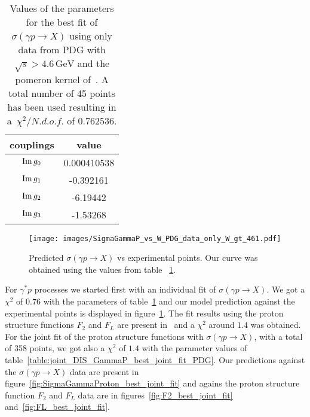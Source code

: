 \documentclass[preprint, 12pt]{elsarticle}
\begin{document}
\begin{table}[b!]
\centering
\caption{Values of the parameters for the best fit of $\sigma\left(\gamma p \rightarrow X\right)$ using only data from PDG with $\sqrt{s} > 4.6 \, \text{GeV}$ and the pomeron kernel of~\cite{gluonPDF_IHQCD_2020}. A total number of 45 points has been used resulting in a~$\chi^2 / {N.d.o.f.}$ of 0.762536. }
\vspace{0.5cm}
\begin{tabular}{|c|c|}
\hline
couplings   & value \\
\hline
${\rm Im} \, g_0$  & 0.000410538\\ 
\hline
${\rm Im} \, g_1$  & -0.392161 \\ 
\hline
${\rm Im} \, g_2$  & -6.19442  \\
\hline
${\rm Im} \, g_3$  & -1.53268\\ 
\hline
\end{tabular}
\label{table:SigmaGammaP_HardPomeron_PDG_best_fit}
\end{table}
\begin{figure}[!b]
\center
\texttt{[image: images/SigmaGammaP\_vs\_W\_PDG\_data\_only\_W\_gt\_461.pdf]} 
\caption{Predicted $\sigma \left( \gamma p \rightarrow X \right)$ vs experimental points. Our curve was obtained using the values from table ~\ref{table:SigmaGammaP_HardPomeron_PDG_best_fit}.}
\label{fig:SigmaGammaProton_data_only_best_fit}
\end{figure}
For $\gamma^{*}p$ processes we started first with an individual fit of $\sigma\left(\gamma p \rightarrow X\right)$. We got a $\chi^2$ of $0.76$ with the parameters of table~\ref{table:SigmaGammaP_HardPomeron_PDG_best_fit} and our model prediction against the experimental points is displayed in figure~\ref{fig:SigmaGammaProton_data_only_best_fit}. The fit results using the proton structure functions $F_2$ and $F_L$ are present in~\cite{gluonPDF_IHQCD_2020} and a $\chi^2$ around $1.4$ was obtained. For the joint fit of the proton structure functions with $\sigma\left(\gamma p \rightarrow X\right)$, with a total of 358 points, we got also a $\chi^2$ of $1.4$ with the parameter values of table~\ref{table:joint_DIS_GammaP_best_joint_fit_PDG}. Our predictions against the $\sigma\left(\gamma p \rightarrow X\right)$ data are present in figure~\ref{fig:SigmaGammaProton_best_joint_fit} and agains the proton structure function $F_2$ and $F_L$ data are in figures~\ref{fig:F2_best_joint_fit} and~\ref{fig:FL_best_joint_fit}.
\end{document}
